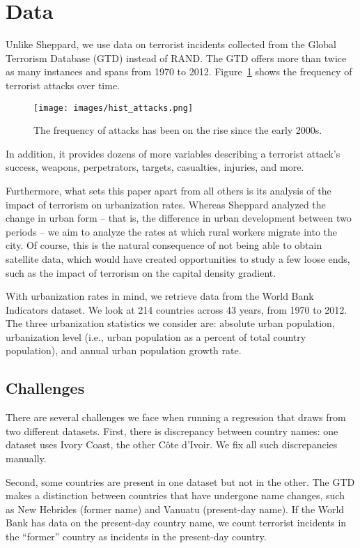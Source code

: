 \documentclass[preprint,2p,12pt]{elsarticle}
\begin{document}
\section{\sc Data}
Unlike Sheppard, we use data on terrorist incidents collected from the Global Terrorism Database (GTD) instead of RAND.
The GTD offers more than twice as many instances and spans from 1970 to 2012.
Figure~\ref{hist_attacks} shows the frequency of terrorist attacks over time.
\begin{figure}[h!]
  \centering
  \texttt{[image: images/hist\_attacks.png]}
  \caption{\label{hist_attacks}The frequency of attacks has been on the rise since the early 2000s.}
\end{figure}
In addition, it provides dozens of more variables describing a terrorist attack's success, weapons, perpetrators, targets, casualties, injuries, and more.

Furthermore, what sets this paper apart from all others is its analysis of the impact of terrorism on urbanization rates.
Whereas Sheppard analyzed the change in urban form -- that is, the difference in urban development between two periods -- we aim to analyze the rates at which rural workers migrate into the city.
Of course, this is the natural consequence of not being able to obtain satellite data, which would have created opportunities to study a few loose ends, such as the impact of terrorism on the capital density gradient. 

With urbanization rates in mind, we retrieve data from the World Bank Indicators dataset.
We look at 214 countries across 43 years, from 1970 to 2012.
The three urbanization statistics we consider are: absolute urban population, urbanization level (i.e., urban population as a percent of total country population), and annual urban population growth rate.

\subsection{Challenges}
There are several challenges we face when running a regression that draws from two different datasets.
First, there is discrepancy between country names: one dataset uses Ivory Coast, the other C\^{o}te d'Ivoir.
We fix all such discrepancies manually.

Second, some countries are present in one dataset but not in the other. 
The GTD makes a distinction between countries that have undergone name changes, such as New Hebrides (former name) and Vanuatu (present-day name).
If the World Bank has data on the present-day country name, we count terrorist incidents in the ``former'' country as incidents in the present-day country.
\end{document}

